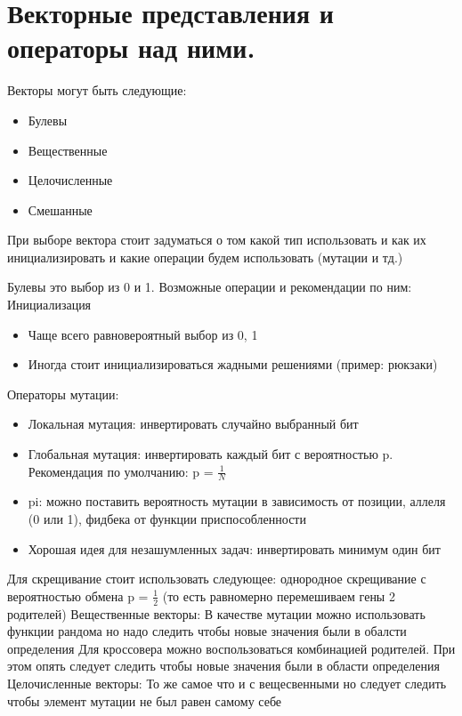 \section{Векторные представления и операторы над ними.}
Векторы могут быть следующие: 
\begin{itemize}
\item Булевы
\item Вещественные
\item Целочисленные
\item Смешанные
\end{itemize}
При выборе вектора стоит задуматься о том какой тип использовать и как их инициализировать и какие операции будем использовать (мутации и тд.)

Булевы это выбор из 0 и 1. 
Возможные операции и рекомендации по ним:
Инициализация
\begin{itemize}
\item Чаще всего равновероятный выбор из {0, 1}
\item Иногда стоит инициализироваться жадными решениями (пример: рюкзаки)
\end{itemize}
Операторы мутации:
\begin{itemize}
\item Локальная мутация: инвертировать случайно выбранный бит
\item Глобальная мутация: инвертировать каждый бит с вероятностью p. Рекомендация по умолчанию: p = $\frac{1}{N}$
\item pi: можно поставить вероятность мутации в зависимость от позиции, аллеля (0 или 1), фидбека от функции приспособленности
\item Хорошая идея для незашумленных задач: инвертировать минимум один бит
\end{itemize}
Для скрещивание стоит использовать следующее: однородное скрещивание с вероятностью обмена p = $\frac{1}{2}$ (то есть равномерно перемешиваем гены 2 родителей)
Вещественные векторы:
В качестве мутации можно использовать функции рандома но надо следить чтобы новые значения были в обалсти определения
Для кроссовера можно воспользоваться комбинацией родителей. При этом опять следует следить чтобы новые значения были в области определения
Целочисленные векторы:
То же самое что и с вещесвенными но следует следить чтобы элемент мутации не был равен самому себе
